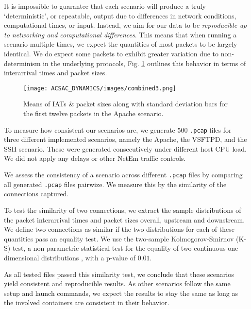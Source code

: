 \documentclass[sigconf]{acmart}
\begin{document}
It is impossible to guarantee that each scenario will produce a truly `deterministic', or repeatable, output due to differences in network conditions, computational times, or input. Instead, we aim for our data to be \textit{reproducible up to networking and computational differences}. This means that when running a scenario multiple times, we expect the quantities of most packets to be largely identical. We do expect some packets to exhibit greater variation due to non-determinism in the underlying protocols, Fig. \ref{fig:size1} outlines this behavior in terms of interarrival times and packet sizes. 

\begin{figure}
\texttt{[image: ACSAC\_DYNAMICS/images/combined3.png]} %
\caption{Means of IATs \& packet sizes along with standard deviation bars for the first twelve packets in the Apache scenario.}
\label{fig:size1}
\end{figure}

To measure how consistent our scenarios are, we generate 500 \texttt{.pcap} files for three different implemented scenarios, namely the Apache, the VSFTPD, and the SSH scenario. These were generated consecutively under different host CPU load. We did not apply any delays or other NetEm traffic controls.

We assess the consistency of a scenario across different \texttt{.pcap} files by comparing all generated \texttt{.pcap} files pairwize. We measure this by the similarity of the connections captured. 

To test the similarity of two connections, we extract the sample distributions of the packet interarrival times and packet sizes overall, upstream and downstream. We define two connections as similar if the two distributions for each of these quantities pass an equality test. We use the two-sample Kolmogorov-Smirnov (K-S) test, a non-parametric statistical test for the equality of two continuous one-dimensional distributions \cite{massey1951kolmogorov}, with a p-value of $0.01$. 

As all tested files passed this similarity test, we conclude that these scenarios yield consistent and reproducible results. As other scenarios follow the same setup and launch commands, we expect the results to stay the same as long as the involved containers are consistent in their behavior.




\end{document}
